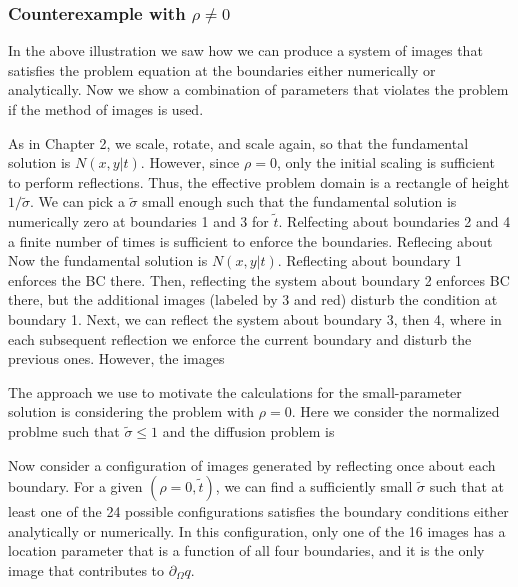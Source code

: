\documentclass[10pt]{article}
\begin{document}
\subsubsection{Counterexample with $\rho \neq 0$}
In the above illustration we saw how we can produce a system of images
that satisfies the problem equation at the boundaries either
numerically or analytically. Now we show a combination of parameters
that violates the problem if the method of images is used.

As in Chapter 2, we scale, rotate, and scale
again, so that the fundamental solution is $N(x,y|t)$. However, since
$\rho=0$, only the initial scaling is sufficient to perform
reflections. Thus, the effective problem domain is a rectangle of
height $1/\tilde{\sigma}$. We can pick a $\tilde{\sigma}$ small enough
such that the fundamental solution is numerically zero at boundaries 1
and 3 for $\tilde{t}$. Relfecting about boundaries 2 and 4 a finite
number of times is sufficient to enforce the boundaries. Reflecing about Now the fundamental solution is
$N(x,y|t)$. Reflecting about boundary 1 enforces the BC there. Then,
reflecting the system about boundary 2 enforces BC there, but the
additional images (labeled by 3 and red) disturb the condition at
boundary 1. Next, we can reflect the system about boundary 3, then 4,
where in each subsequent reflection we enforce the current boundary
and disturb the previous ones. However, the images

The approach we use to motivate the calculations for the
small-parameter solution is considering the problem with
$\rho=0$. Here we consider the normalized problme such that
$\tilde{\sigma} \leq 1$ and the diffusion problem is

Now consider a configuration of images generated by reflecting once
about each boundary. For a given $(\rho=0, \tilde{t})$, we can find a
sufficiently small $\tilde{\sigma}$ such that at least one of the 24
possible configurations satisfies the boundary conditions either
analytically or numerically. In this configuration, only one of the 16
images has a location parameter that is a function of all four
boundaries, and it is the only image that contributes to $\partial_{\Omega} q$. 
\end{document}

